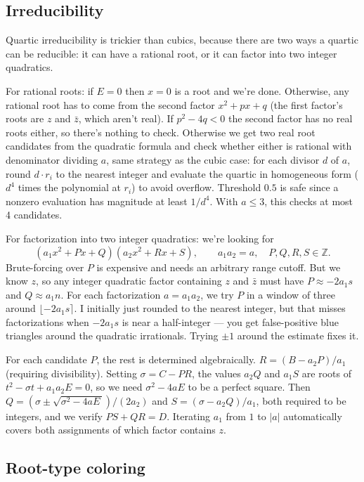 \documentclass[11pt]{article}
\newcommand{\Z}{\mathbb{Z}}
\begin{document}
\subsection{Irreducibility}

Quartic irreducibility is trickier than cubics, because there are two ways a quartic can be reducible: it can have a rational root, or it can factor into two integer quadratics.

For rational roots: if $E = 0$ then $x = 0$ is a root and we're done.
Otherwise, any rational root has to come from the second factor $x^2 + px + q$ (the first factor's roots are $z$ and $\bar{z}$, which aren't real).
If $p^2 - 4q < 0$ the second factor has no real roots either, so there's nothing to check.
Otherwise we get two real root candidates from the quadratic formula and check whether either is rational with denominator dividing $a$, same strategy as the cubic case: for each divisor $d$ of $a$, round $d \cdot r_i$ to the nearest integer and evaluate the quartic in homogeneous form ($d^4$ times the polynomial at $r_i$) to avoid overflow.
Threshold $0.5$ is safe since a nonzero evaluation has magnitude at least $1/d^4$.
With $a \leq 3$, this checks at most 4 candidates.

For factorization into two integer quadratics: we're looking for
\[
    (a_1 x^2 + Px + Q)(a_2 x^2 + Rx + S), \qquad a_1 a_2 = a, \quad P, Q, R, S \in \Z.
\]
Brute-forcing over $P$ is expensive and needs an arbitrary range cutoff.
But we know $z$, so any integer quadratic factor containing $z$ and $\bar{z}$ must have $P \approx -2a_1 s$ and $Q \approx a_1 n$.
For each factorization $a = a_1 a_2$, we try $P$ in a window of three around $\lfloor -2a_1 s \rceil$.
I initially just rounded to the nearest integer, but that misses factorizations when $-2a_1 s$ is near a half-integer --- you get false-positive blue triangles around the quadratic irrationals.
Trying $\pm 1$ around the estimate fixes it.

For each candidate $P$, the rest is determined algebraically.
$R = (B - a_2 P)/a_1$ (requiring divisibility).
Setting $\sigma = C - PR$, the values $a_2 Q$ and $a_1 S$ are roots of $t^2 - \sigma t + a_1 a_2 E = 0$, so we need $\sigma^2 - 4aE$ to be a perfect square.
Then $Q = (\sigma \pm \sqrt{\sigma^2 - 4aE\,})/(2a_2)$ and $S = (\sigma - a_2 Q)/a_1$, both required to be integers, and we verify $PS + QR = D$.
Iterating $a_1$ from $1$ to $|a|$ automatically covers both assignments of which factor contains $z$.

\subsection{Root-type coloring}
\end{document}
